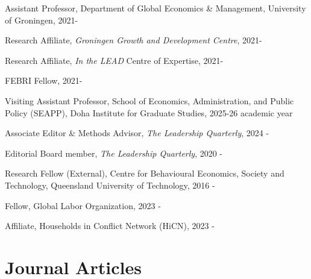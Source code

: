 \documentclass[letterpaper]{article}
\renewenvironment{itemize}{
  \begin{list}{}{
    \setlength{\leftmargin}{1.5em}
  }
}{
  \end{list}
}
\begin{document}
\begin{itemize}
	
	\item Assistant Professor, Department of Global Economics \& Management, University of Groningen, 2021-
	\begin{itemize}
	\item Research Affiliate, \textit{Groningen Growth and Development Centre}, 2021-
	\item Research Affiliate, \textit{In the LEAD} Centre of Expertise, 2021-
	\item FEBRI Fellow, 2021-
	\end{itemize}
	\item Visiting Assistant Professor, School of Economics, Administration, and Public Policy (SEAPP), Doha Institute for Graduate Studies, 2025-26 academic year
	\item Associate Editor \& Methods Advisor, \textit{The Leadership Quarterly}, 2024 -
	\item Editorial Board member, \textit{The Leadership Quarterly}, 2020 -
	\item Research Fellow (External), Centre for Behavioural Economics, Society and Technology, Queensland University of Technology, 2016 -
	\item Fellow, Global Labor Organization, 2023 -
	\item Affiliate, Households in Conflict Network (HiCN), 2023 -
\end{itemize}

		
\section*{Journal Articles}
\end{document}
